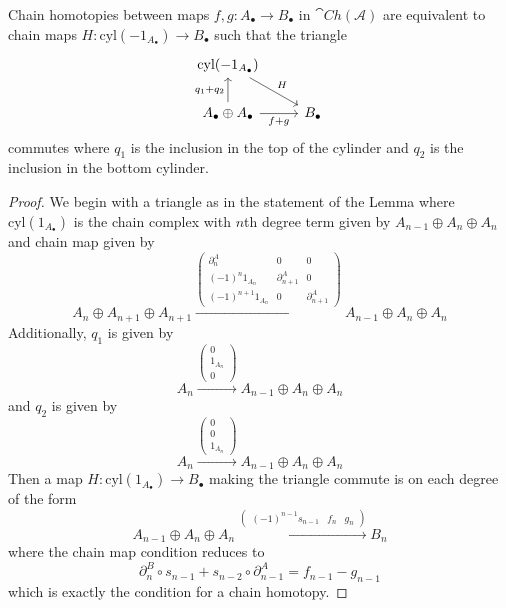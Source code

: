 \begin{lem}[label=lem:cylHomotop]
    Chain homotopies between maps $f,g:A_\bullet\to B_\bullet$ in $\cat{Ch}(\mathcal{A})$ are equivalent to chain maps $H:\text{cyl}(-1_{A_\bullet})\to B_\bullet$ such that the triangle
    \[\begin{tikzcd}
        {\text{cyl}(-1_{A_\bullet})} \\
        {A_\bullet\oplus A_\bullet} & {B_\bullet}
        \arrow["{f+g}"', from=2-1, to=2-2]
        \arrow["H", from=1-1, to=2-2]
        \arrow["{q_1+q_2}", from=2-1, to=1-1]
    \end{tikzcd}\]
    commutes where $q_1$ is the inclusion in the top of the cylinder and $q_2$ is the inclusion in the bottom cylinder.
\end{lem}
\begin{proof}
    We begin with a triangle as in the statement of the Lemma where $\text{cyl}(1_{A_\bullet})$ is the chain complex with $n$th degree term given by $A_{n-1}\oplus A_n\oplus A_n$ and chain map given by 
    \begin{equation*}
        A_n\oplus A_{n+1}\oplus A_{n+1}\xrightarrow{\begin{pmatrix} \partial_n^A & 0 & 0 \\ (-1)^n1_{A_n} & \partial_{n+1}^A & 0 \\ (-1)^{n+1}1_{A_n} & 0 & \partial_{n+1}^A \end{pmatrix}}A_{n-1}\oplus A_n\oplus A_n
    \end{equation*}
    Additionally, $q_1$ is given by 
    \begin{equation*}
        A_n\xrightarrow{\begin{pmatrix} 0 \\ 1_{A_n} \\ 0 \end{pmatrix}} A_{n-1}\oplus A_n\oplus A_n
    \end{equation*}
    and $q_2$ is given by 
    \begin{equation*}
        A_n\xrightarrow{\begin{pmatrix} 0 \\ 0 \\ 1_{A_n} \end{pmatrix}} A_{n-1}\oplus A_n\oplus A_n
    \end{equation*}
    Then a map $H:\text{cyl}(1_{A_\bullet})\to B_\bullet$ making the triangle commute is on each degree of the form
    \begin{equation*}
        A_{n-1}\oplus A_n\oplus A_n\xrightarrow{\begin{pmatrix} (-1)^{n-1}s_{n-1} & f_n & g_n \end{pmatrix}} B_n
    \end{equation*}
    where the chain map condition reduces to 
    \begin{equation*}
        \partial_n^B\circ s_{n-1}+s_{n-2}\circ \partial_{n-1}^A = f_{n-1}-g_{n-1}
    \end{equation*}
    which is exactly the condition for a chain homotopy.
\end{proof}

